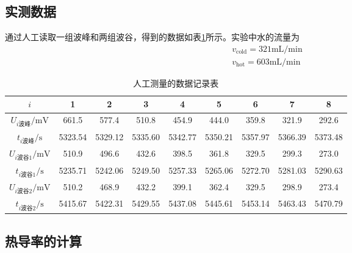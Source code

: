 \documentclass{ctexart}
\begin{document}
	\subsection{实测数据}
	通过人工读取一组波峰和两组波谷，得到的数据如表\ref{tab:datamanual}所示。实验中水的流量为
	\begin{align}
		v_{\text{cold}}=321\text{mL/min}\\
		v_{\text{hot}}=603\text{mL/min}
	\end{align}
	\begin{table}[H]
		\begin{center}
			\caption{人工测量的数据记录表}
			\begin{tabular}{c|cccccccc}
				$i$&1&2&3&4&5&6&7&8\\
				\hline
				$U_{i\text{波峰}}/\text{mV}$&661.5&577.4&510.8&454.9&444.0&359.8&321.9&292.6\\
				\hline
				$t_{i\text{波峰}}/\text{s}$&5323.54&5329.12&5335.60&5342.77&5350.21&5357.97&5366.39&5373.48\\
				\hline
				$U_{i\text{波谷1}}/\text{mV}$&510.9&496.6&432.6&398.5&361.8&329.5&299.3&273.0\\
				\hline
				$t_{i\text{波谷1}}/\text{s}$&5235.71&5242.06&5249.50&5257.33&5265.06&5272.70&5281.03&5290.63\\
				\hline
				$U_{i\text{波谷2}}/\text{mV}$&510.2&468.9&432.2&399.1&362.4&329.5&298.9&273.4\\
				\hline
				$t_{i\text{波谷2}}/\text{s}$&5415.67&5422.31&5429.55&5437.08&5445.61&5453.14&5463.43&5470.79
				\label{tab:datamanual}
			\end{tabular}
		\end{center}
	\end{table}
	\subsection{热导率的计算}
\end{document}
